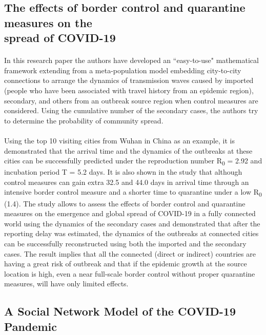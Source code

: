 \documentclass[12pt, a4paper]{extarticle}
\begin{document}
	    \subsection{The effects of border control and quarantine measures on the\\spread of COVID-19}
            \paragraph{} In this research paper the authors have developed an ``easy-to-use" mathematical framework extending from a meta-population model embedding city-to-city connections to arrange the dynamics of transmission waves caused by imported (people who have been associated with travel history from an epidemic region), secondary, and others from an outbreak source region when control measures are considered. Using the cumulative number of the secondary cases, the authors try to determine the probability of community spread.

            \paragraph{} Using the top 10 visiting cities from Wuhan in China as an example, it is demonstrated that the arrival time and the dynamics of the outbreaks at these cities can be successfully predicted under the reproduction number R\textsubscript{0} = 2.92 and incubation period T = 5.2 days. It is also shown in the study that although control measures can gain extra 32.5 and 44.0 days in arrival time through an intensive border control measure and a shorter time to quarantine under a low R\textsubscript{0} (1.4). The study allows to assess the effects of border control and quarantine measures on the emergence and global spread of COVID-19 in a fully connected world using the dynamics of the secondary cases and demonstrated that after the reporting delay was estimated, the dynamics of the outbreaks at connected cities can be successfully reconstructed using both the imported and the secondary cases. The result implies that all the connected (direct or indirect) countries are having a great risk of outbreak and that if the epidemic growth at the source location is high, even a near full-scale border control without proper quarantine measures, will have only limited effects.
	    \subsection{A Social Network Model of the COVID-19 Pandemic}
\end{document}
